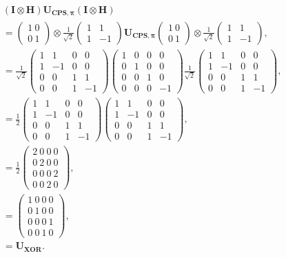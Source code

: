 \documentclass{article}
\begin{document}
\begin{align*}\label{eq 12.5}
  &(\boldsymbol{I}\otimes\boldsymbol{H})\boldsymbol{U_{CPS,\pi}}(\boldsymbol{I}\otimes\boldsymbol{H})\\[5pt]
  &=\begin{pmatrix}
    1\ 0\\ 0\ 1
  \end{pmatrix}\otimes\frac{1}{\sqrt{2}}
  \begin{pmatrix}
    1&1\\1&-1
  \end{pmatrix}\boldsymbol{U_{CPS,\pi}}
  \begin{pmatrix}
    1\ 0\\ 0\ 1
  \end{pmatrix}\otimes\frac{1}{\sqrt{2}}
  \begin{pmatrix}
    1&1\\1&-1
  \end{pmatrix},\\[5pt]
  &=\frac{1}{\sqrt{2}}\begin{pmatrix}
    1&1&0&0\\1&-1&0&0\\0&0&1&1\\0&0&1&-1
  \end{pmatrix}
  \begin{pmatrix}
    1&0&0&0\\0&1&0&0\\0&0&1&0\\0&0&0&-1
  \end{pmatrix}
  \frac{1}{\sqrt{2}}
  \begin{pmatrix}
    1&1&0&0\\1&-1&0&0\\0&0&1&1\\0&0&1&-1
  \end{pmatrix},\\[5pt]
  &=\frac{1}{2}\begin{pmatrix}
    1&1&0&0\\1&-1&0&0\\0&0&1&1\\0&0&1&-1
  \end{pmatrix}
  \begin{pmatrix}
    1&1&0&0\\1&-1&0&0\\0&0&1&1\\0&0&1&-1
  \end{pmatrix},\\[5pt]
  &=\frac{1}{2}\begin{pmatrix}
    2\ 0\ 0\ 0\\ 0\ 2\ 0\ 0\\0\ 0\ 0\ 2\\ 0\ 0\ 2\ 0
  \end{pmatrix},\\[5pt]
  &=\begin{pmatrix}
    1\ 0\ 0\ 0\\ 0\ 1\ 0\ 0\\0\ 0\ 0\ 1\\ 0\ 0\ 1\ 0
  \end{pmatrix},\\[5pt]
  &=\boldsymbol{U_{XOR}}. \tag{12.5}
\end{align*}
\end{document}
